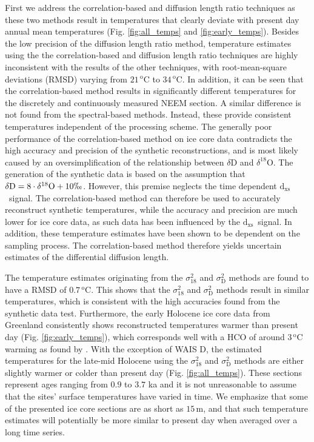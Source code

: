 \documentclass[11pt, draftcls, onecolumn]{IEEEtran} %
\numberwithin{equation}{section}
\numberwithin{table}{section}
\numberwithin{figure}{section}
\newcommand{\Dxs}{$\mathrm{d_{xs}}$}
\begin{document}
First we address the correlation-based and diffusion length ratio techniques as these two
methods result in temperatures that clearly deviate with present day annual mean temperatures (Fig. \ref{fig:all_temps} and \ref{fig:early_temps}).
Besides the low precision of the diffusion length ratio method, 
temperature estimates using the the correlation-based and diffusion length ratio techniques 
are highly inconsistent with the results of the 
other techniques, with root-mean-square deviations (RMSD) varying from $21\,^\mathrm{o}\mathrm{C}$ to $34 \, ^\mathrm{o}\mathrm{C}$. 
In addition, it can be seen that the correlation-based method results in significantly different 
temperatures for the discretely and continuously measured NEEM section.
A similar difference is not found from the spectral-based methods. Instead, these provide
consistent temperatures independent of the processing scheme.
The generally poor performance of the correlation-based method on ice core data contradicts the high accuracy and precision of the synthetic reconstructions, and is most likely caused by an oversimplification of the relationship between $\delta\mathrm{D}$ and $\delta^{18}\mathrm{O}$. The generation of the synthetic data is based on the assumption that $\delta\mathrm{D} = 8\cdot \delta^{18}\mathrm{O} + 10 \permil$. However, this premise neglects the time dependent \Dxs~signal. 
The correlation-based method can therefore be used to accurately reconstruct synthetic temperatures, while the accuracy and precision are much lower for ice core data,
as such data has been influenced by the \Dxs~signal.
In addition, these temperature estimates have been shown to be dependent on the sampling process. The correlation-based method therefore yields uncertain estimates of the differential diffusion length.

The temperature estimates originating from the $\sigma^2_{18}$ and $\sigma^2_{\mathrm{D}}$ methods are found to have a RMSD of $0.7\,^\mathrm{o}\mathrm{C}$. This shows that the $\sigma^2_{18}$ and $\sigma^2_{\mathrm{D}}$ methods result in similar temperatures, which is consistent with the high accuracies found from the synthetic data test.
Furthermore, the early Holocene ice core data from Greenland consistently shows reconstructed temperatures warmer than present day (Fig. \ref{fig:early_temps}), 
which corresponds well with a HCO of around $3\,^\mathrm{o}\mathrm{C}$ warming as found by \citet{Dorthe1998, Vinther2009}.
With the exception of WAIS D, the estimated temperatures for the late-mid Holocene using the $\sigma^2_{18}$ and $\sigma^2_{\mathrm{D}}$ methods 
are either slightly warmer or colder than present day (Fig. \ref{fig:all_temps}).
These sections represent ages ranging from $0.9$ to $3.7$ ka
and it is not unreasonable to assume that the sites' surface temperatures
have varied in time. 
We emphasize that some of the presented ice core sections are as short as $15\,\mathrm{m}$,
and that such temperature estimates will potentially be more similar to present day when averaged over a long time series.
\end{document}
